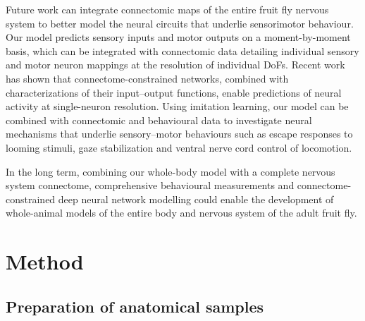 \documentclass[sn-mathphys-num]{sn-jnl}%
\theoremstyle{thmstyleone}%
\theoremstyle{thmstyletwo}%
\theoremstyle{thmstylethree}%
\begin{document}
Future work can integrate connectomic maps of the entire fruit fly nervous system\cite{dorkenwald2024neuronal,schlegel2024whole,lesser2024synaptic,azevedo2024connectomic,cheong2023transforming,marin2023systematic,takemura2023connectome} to better model the neural circuits that underlie sensorimotor behaviour. 
Our model predicts sensory inputs and motor outputs on a moment-by-moment basis, which can be integrated with connectomic data detailing individual sensory and motor neuron mappings at the resolution of individual DoFs\cite{azevedo2024connectomic}. 
Recent work\cite{lappalainen2024connectome} has shown that connectome-constrained networks, combined with characterizations of their input–output functions, enable predictions of neural activity at single-neuron resolution. 
Using imitation learning, our model can be combined with connectomic and behavioural data to investigate neural mechanisms that underlie sensory–motor behaviours such as escape responses to looming stimuli\cite{card2012escape}, gaze stabilization\cite{cruz2023multilevel} and ventral nerve cord control of locomotion.


In the long term, combining our whole-body model with a complete nervous system connectome, comprehensive behavioural measurements and connectome-constrained deep neural network modelling\cite{lappalainen2024connectome,mi2021connectome} could enable the development of whole-animal models of the entire body and nervous system of the adult fruit fly.



\section{Method} \label{sec:method}

\subsection{Preparation of anatomical samples}
\end{document}
